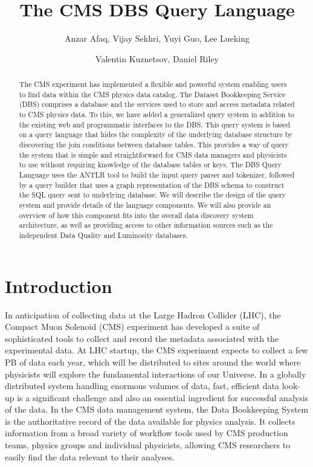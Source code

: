 \documentclass[a4paper]{jpconf}
\begin{document}
\title{The CMS DBS Query Language}

\author{Anzar Afaq, Vijay Sekhri, Yuyi Guo, Lee Lueking}
\address{Fermilab, Batavia, Illinois, USA}

\author{Valentin Kuznetsov, Daniel Riley}
\address{Cornell University, Ithaca, New York, USA}

\begin{abstract}
The CMS experiment has implemented a flexible and 
powerful system enabling users to find data within 
the CMS physics data catalog. The Dataset Bookkeeping 
Service (DBS) comprises a database and the services 
used to store and access metadata related to CMS physics 
data.  To this, we have added a generalized query system
in addition to the existing web and programmatic interfaces to the DBS.
This query system is based on a query language that hides the 
complexity of the underlying database structure by discovering the join conditions between
database tables. This provides 
a way of query the system that is simple and straightforward for 
CMS data managers and physicists to use without requiring knowledge of the database
tables or keys. The DBS Query Language 
uses the ANTLR tool to build the input query parser and tokenizer, 
followed by a query builder that uses a graph representation of the 
DBS schema to construct the SQL query sent to underlying database. 
We will describe the design of the query system and provide 
details of the language components. We will also provide an 
overview of how this component fits into the overall data 
discovery system architecture, as well as providing access to other information sources
such as the independent Data Quality and Luminosity databases.
\end{abstract}

\section{Introduction}

In anticipation of collecting data at the Large Hadron Collider (LHC),
the Compact Muon Solenoid (CMS) experiment has
developed a suite of sophisticated tools
to collect and record the metadata associated with the experimental data. At
LHC startup, the CMS experiment expects to collect a few
PB of data each year, which will be distributed to sites
around the world where physicists will explore the fundamental
interactions of our Universe. In a globally distributed system handling enormous volumes of data,
fast, efficient data look-up is a significant
challenge and also an essential ingredient for successful
analysis of the data. In the CMS data management system, the Data Bookkeeping
System\cite{DBS} is the authoritative record of
the data available for physics analysis. It collects
information from a broad variety of workflow tools used by CMS production teams, physics groups and individual physicists, allowing
CMS researchers to easily find the data relevant to their analyses.
\end{document}
